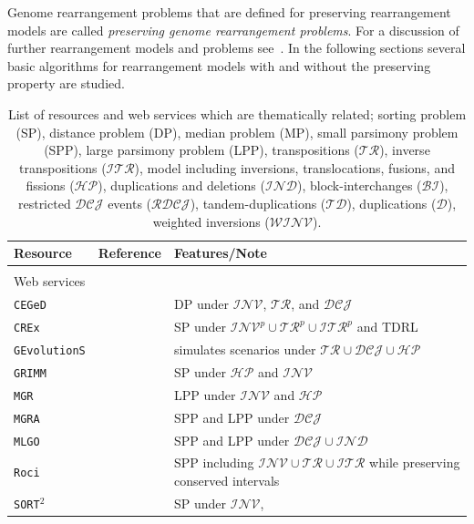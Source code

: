 \documentclass{svmult}
\newcommand{\m}[1]{\mathcal{#1}}
\begin{document}
Genome rearrangement problems that are defined for preserving rearrangement models are called \emph{preserving genome rearrangement problems}. 
For a discussion of further rearrangement models and problems see~\cite{Fertin_2009}.
In the following sections several basic algorithms for rearrangement models with and without the preserving property are studied. 

\begin{table}
\caption{List of resources and web services which are thematically related;
sorting problem (SP), distance problem (DP), median problem (MP), small parsimony problem (SPP), large parsimony problem
(LPP), transpositions ($\m{TR}$), inverse transpositions ($\m{ITR}$), model including
inversions, translocations, fusions, and fissions ($\m{HP}$), duplications and deletions
($\m{IND}$), block-interchanges ($\m{BI}$), restricted $\m{DCJ}$ events
($\m{RDCJ}$), tandem-duplications ($\m{TD}$), duplications ($\m{D}$), weighted
inversions ($\m{WINV}$).}
\begin{center}
\begin{threeparttable}
  \begin{tabular}{l l p{7.2cm}}
    \hline
    Resource & Reference & Features/Note\\
    \hline \\
    Web services & & \\
    \hline
    \texttt{CEGeD} & \cite{CEGeD,Bergeron_2006} & DP under
    $\m{INV}$, $\m{TR}$, and $\m{DCJ}$\\
    \texttt{CREx} & \cite{CREX,Bernt_2007b} & SP under
    $\m{INV}^p\cup\m{TR}^p\cup\m{ITR}^p$ and TDRL \\
    \texttt{GEvolutionS} & \cite{GEvolutionS} & simulates scenarios under
    $\m{TR}\cup\m{DCJ}\cup\m{HP}$\\
    \texttt{GRIMM}\tnote{a} & \cite{Tesler_2002b,GRIMM} & SP under $\m{HP}$ and $\m{INV}$ \\
    \texttt{MGR}\tnote{a} & \cite{MGR,Bourque_2002} & LPP under $\m{INV}$
    and $\m{HP}$\\
    \texttt{MGRA} & \cite{Alekseyev_2009,MGRA} & SPP and LPP under $\m{DCJ}$\\
    \texttt{MLGO} & \cite{MLGO,Hu_2014} & SPP and LPP under $\m{DCJ}\cup\m{IND}$\\
    \texttt{Roci} & \cite{Stoye_2009,ROCI} & SPP including
    $\m{INV} \cup \m{TR} \cup \m{ITR}$ while preserving conserved intervals\\
    \texttt{SORT$^2$} & \cite{SORT2,Huang_2010} & SP under $\m{INV}$,

\end{tabular}
\end{threeparttable}
\end{center}
\end{table}
\end{document}
